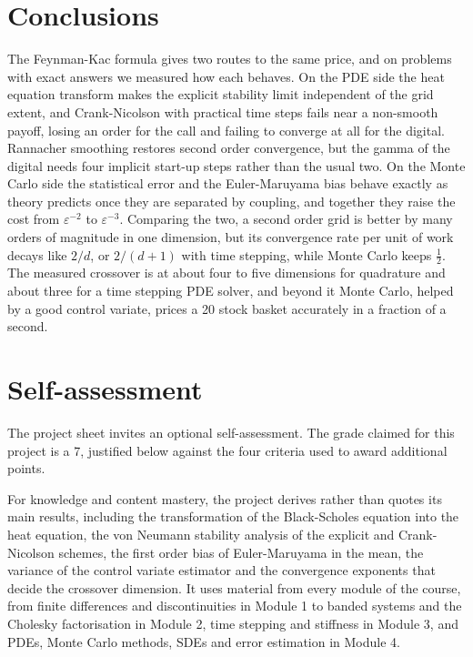 \documentclass[11pt,a4paper]{article}
\begin{document}
\section{Conclusions}\label{sec:conclusions}

The Feynman-Kac formula gives two routes to the same price, and on problems with exact answers we measured how each behaves. On the PDE side the heat equation transform makes the explicit stability limit independent of the grid extent, and Crank-Nicolson with practical time steps fails near a non-smooth payoff, losing an order for the call and failing to converge at all for the digital. Rannacher smoothing restores second order convergence, but the gamma of the digital needs four implicit start-up steps rather than the usual two. On the Monte Carlo side the statistical error and the Euler-Maruyama bias behave exactly as theory predicts once they are separated by coupling, and together they raise the cost from $\varepsilon^{-2}$ to $\varepsilon^{-3}$. Comparing the two, a second order grid is better by many orders of magnitude in one dimension, but its convergence rate per unit of work decays like $2/d$, or $2/(d+1)$ with time stepping, while Monte Carlo keeps $\frac{1}{2}$. The measured crossover is at about four to five dimensions for quadrature and about three for a time stepping PDE solver, and beyond it Monte Carlo, helped by a good control variate, prices a 20 stock basket accurately in a fraction of a second.

\section{Self-assessment}\label{sec:self}

The project sheet invites an optional self-assessment. The grade claimed for this project is a 7, justified below against the four criteria used to award additional points.

For knowledge and content mastery, the project derives rather than quotes its main results, including the transformation of the Black-Scholes equation into the heat equation, the von Neumann stability analysis of the explicit and Crank-Nicolson schemes, the first order bias of Euler-Maruyama in the mean, the variance of the control variate estimator and the convergence exponents that decide the crossover dimension. It uses material from every module of the course, from finite differences and discontinuities in Module 1 to banded systems and the Cholesky factorisation in Module 2, time stepping and stiffness in Module 3, and PDEs, Monte Carlo methods, SDEs and error estimation in Module 4.
\end{document}
